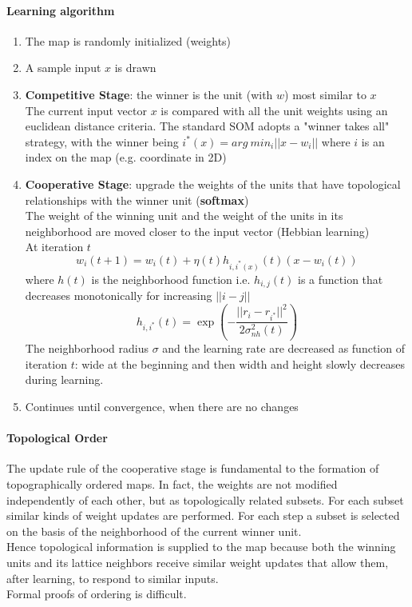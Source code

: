 \documentclass[10pt]{report}
\begin{document}
\paragraph{Learning algorithm}\begin{enumerate}
	\item The map is randomly initialized (weights)
	\item A sample input $x$ is drawn
	\item \textbf{Competitive Stage}: the winner is the unit (with $w$) most similar to $x$\\
The current input vector $x$ is compared with all the unit weights using an euclidean distance criteria. The standard SOM adopts a "winner takes all" strategy, with the winner being $i^*(x) = arg\:min_i||x-w_i||$ where $i$ is an index on the map (e.g. coordinate in 2D)
	\item \textbf{Cooperative Stage}: upgrade the weights of the units that have topological relationships with the winner unit (\textbf{softmax})\\
	The weight of the winning unit and the weight of the units in its neighborhood are moved closer to the input vector (Hebbian learning)\\
	At iteration $t$ $$w_i(t+1) = w_i(t) +\eta(t)h_{i,i^*(x)}(t)(x - w_i(t))$$ where $h(t)$ is the neighborhood function i.e. $h_{i,j}(t)$ is a function that decreases monotonically for increasing $||i-j||$ $$h_{i,i^*}(t)=\exp\left(-\frac{||r_i - r_{i^*}||^2}{2\sigma^2_{nh}(t)}\right)$$
	The neighborhood radius $\sigma$ and the learning rate are decreased as function of iteration $t$: wide at the beginning and then width and height slowly decreases during learning.
	\item Continues until convergence, when there are no changes
\end{enumerate}
\paragraph{Topological Order} The update rule of the cooperative stage is fundamental to the formation of topographically ordered maps. In fact, the weights are not modified independently of each other, but as topologically related subsets. For each subset similar kinds of weight updates are performed. For each step a subset is selected on the basis of the neighborhood of the current winner unit.\\
Hence topological information is supplied to the map because both the winning units and its lattice neighbors receive similar weight updates that allow them, after learning, to respond to similar inputs.\\
Formal proofs of ordering is difficult.
\end{document}
